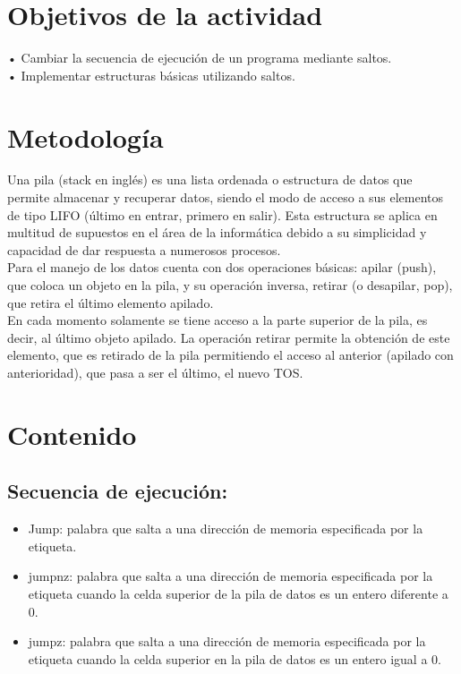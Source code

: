 \documentclass[conference]{IEEEtran}
\begin{document}
\section{Objetivos de la actividad}
\begin{center}
• Cambiar la secuencia de ejecución de un programa mediante saltos.\\
• Implementar estructuras básicas utilizando saltos.
\end{center}

\section{Metodología}
Una pila (stack en inglés) es una lista ordenada o estructura de datos que permite almacenar y recuperar datos, siendo el modo de acceso a sus elementos de tipo LIFO (último en entrar, primero en salir). Esta estructura se aplica en multitud de supuestos en el área de la informática debido a su simplicidad y capacidad de dar respuesta a numerosos procesos.\\

Para el manejo de los datos cuenta con dos operaciones básicas: apilar (push), que coloca un objeto en la pila, y su operación inversa, retirar (o desapilar, pop), que retira el último elemento apilado.\\

En cada momento solamente se tiene acceso a la parte superior de la pila, es decir, al último objeto apilado. La operación retirar permite la obtención de este elemento, que es retirado de la pila permitiendo el acceso al anterior (apilado con anterioridad), que pasa a ser el último, el nuevo TOS.

\section{Contenido}
\subsection{Secuencia de ejecución:}
\begin{itemize}
\item Jump: palabra que salta a una dirección de memoria especificada por la etiqueta.
\item jumpnz: palabra que salta a una dirección de memoria especificada por la etiqueta cuando la celda superior de la pila de datos es un entero diferente a 0.
\item jumpz: palabra que salta a una dirección de memoria especificada por la etiqueta cuando la celda superior en la pila de datos es un entero igual a 0.
\end{itemize}
\end{document}
